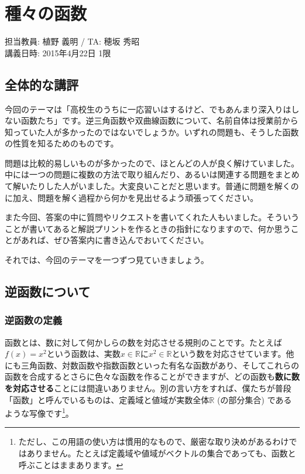 \chapter{種々の函数}

\begin{flushright}
担当教員: 植野 義明 / TA: 穂坂 秀昭 \\
講義日時: 2015年4月22日 1限
\end{flushright}

\section{全体的な講評}

今回のテーマは「高校生のうちに一応習いはするけど、でもあんまり深入りはしない函数たち」です。逆三角函数や双曲線函数について、名前自体は授業前から知っていた人が多かったのではないでしょうか。いずれの問題も、そうした函数の性質を知るためのものです。

問題は比較的易しいものが多かったので、ほとんどの人が良く解けていました。中には一つの問題に複数の方法で取り組んだり、あるいは関連する問題をまとめて解いたりした人がいました。大変良いことだと思います。普通に問題を解くのに加え、問題を解く過程から何かを見出せるよう頑張ってください。

また今回、答案の中に質問やリクエストを書いてくれた人もいました。そういうことが書いてあると解説プリントを作るときの指針になりますので、何か思うことがあれば、ぜひ答案内に書き込んでおいてください。

それでは、今回のテーマを一つずつ見ていきましょう。

\section{逆函数について}


\subsection{逆函数の定義}

函数とは、数に対して何かしらの数を対応させる規則のことです。たとえば$f(x)=x^2$という函数は、実数$x\in\mathbb{R}$に$x^2\in\mathbb{R}$という数を対応させています。他にも三角函数、対数函数や指数函数といった有名な函数があり、そしてこれらの函数を合成するとさらに色々な函数を作ることができますが、どの函数も\textbf{数に数を対応させる}ことには間違いありません。別の言い方をすれば、僕たちが普段「函数」と呼んでいるものは、定義域と値域が実数全体$\mathbb{R}$ (の部分集合) であるような写像です\footnote{ただし、この用語の使い方は慣用的なもので、厳密な取り決めがあるわけではありません。たとえば定義域や値域がベクトルの集合であっても、函数と呼ぶことはままあります。}。

